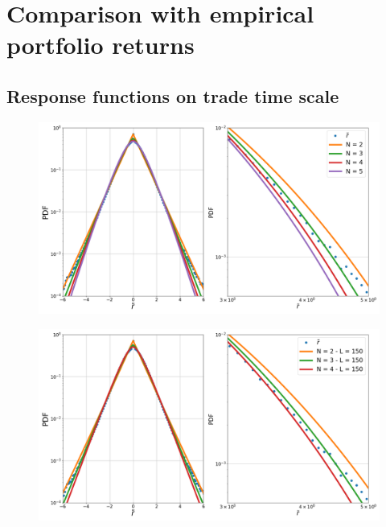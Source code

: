\section{Comparison with empirical portfolio returns}
\label{sec:comparison_returns}



\subsection{Response functions on trade time scale}
\label{subsec:response_function_trade}

\begin{figure}[htbp]
    \centering
    \includegraphics[width=0.7\columnwidth]
    {figures/08_gg.png}
    \caption{}
    \label{fig:gg_dist}
\end{figure}

\begin{figure}[htbp]
    \centering
    \includegraphics[width=0.7\columnwidth]
    {figures/08_ga.png}
    \caption{}
    \label{fig:ga_dist}
\end{figure}


